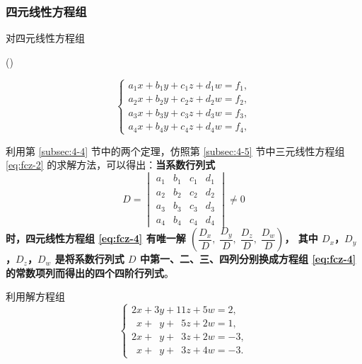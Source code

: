 \subsubsection{四元线性方程组}

对四元线性方程组

(\thefangchengzu)
\begin{minipage}[c]{0.90\textwidth}
    $$\begin{cases}
        a_1 x + b_1 y + c_1 z + d_1 w = f_1, \\
        a_2 x + b_2 y + c_2 z + d_2 w = f_2, \\
        a_3 x + b_3 y + c_3 z + d_3 w = f_3, \\
        a_4 x + b_4 y + c_4 z + d_4 w = f_4,
    \end{cases}$$
\end{minipage}
利用第 \ref{subsec:4-4} 节中的两个定理，仿照第 \ref{subsec:4-5} 节中三元线性方程组 \eqref{eq:fcz-2}
的求解方法，可以得出：\textbf{当系数行列式
$$
D = \begin{vmatrix*}
	a_1 & b_1 & c_1 & d_1 \\
	a_2 & b_2 & c_2 & d_2 \\
	a_3 & b_3 & c_3 & d_3 \\
	a_4 & b_4 & c_4 & d_4
\end{vmatrix*} \neq 0
$$
时，四元线性方程组 \eqref{eq:fcz-4} 有唯一解
$\left( \dfrac{D_x}{D},\; \dfrac{D_y}{D},\; \dfrac{D_z}{D},\; \dfrac{D_w}{D} \right)$，
其中 $D_x$，$D_y$，$D_z$，$D_w$ 是将系数行列式 $D$ 中第一、二、三、四列分别换成方程组
\eqref{eq:fcz-4} 的常数项列而得出的四个四阶行列式}。

\setcounter{cntliti}{4}
\liti 利用解方程组
$$\begin{cases}
    2x + 3y + 11z + 5w = 2, \\
    \phantom{1}x + \phantom{1}y + \phantom{1}5z + 2w = 1, \\
    2x + \phantom{1}y + \phantom{1}3z + 2w = -3 , \\
    \phantom{1}x + \phantom{1}y + \phantom{1}3z + 4w = -3 .
\end{cases}$$

